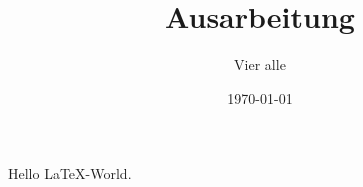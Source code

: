 \documentclass[11pt,a4paper]{article}
\title{Ausarbeitung}
\author{Vier alle}
\date{\today}
\begin{document}
\maketitle

Hello \LaTeX-World.
\end{document}
